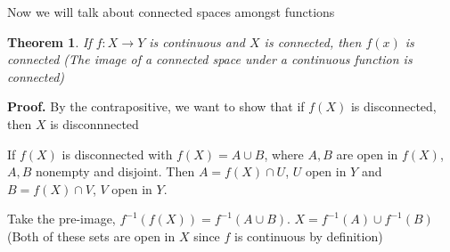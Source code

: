 \documentclass{article}
\newtheorem*{theorem*}{Theorem}
\begin{document}
\newpage

Now we will talk about connected spaces amongst functions
\begin{tcolorbox}[colback=theorem!75]
    \begin{theorem*}
       If $f: X \rightarrow Y$  is continuous and $X$ is connected, then $f(x)$ is connected (The image of a connected space under a continuous function is connected)
       \vspace{2mm}
    \end{theorem*}   
    \textbf{Proof.} By the contrapositive, we want to show that if $f(X)$ is disconnected, then $X$ is disconnnected
    \vspace{2mm}
    
    If $f(X)$ is disconnected with $f(X) = A \cup B$, where $A,B$ are open in $f(X)$, $A,B$ nonempty and disjoint. Then $A = f(X) \cap U$, $U$ open in $Y$ and $B = f(X) \cap V$, $V$ open in $Y$.
    \vspace{2mm} 
    
    Take the pre-image, $f^{-1}(f(X)) = f^{-1}(A \cup B)$.
    $X = f^{-1}(A) \cup f^{-1}(B)$ (Both of these sets are open in $X$ since $f$ is continuous by definition) 
\end{tcolorbox}
\end{document}
